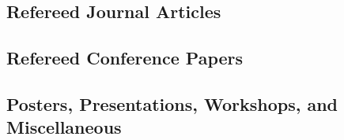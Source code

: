 
\subsection{Refereed Journal Articles}
\begin{refsection}
\nocite{*}
\printbibliography[heading=none,sorting=ynt]
\end{refsection}

\subsection{Refereed Conference Papers}
\begin{refsection}
\nocite{*}
\printbibliography[heading=none,sorting=ynt]
\end{refsection}



\subsection{Posters, Presentations, Workshops, and Miscellaneous}
\begin{refsection}
\nocite{*}
\printbibliography[heading=none,sorting=ynt]
\end{refsection}


